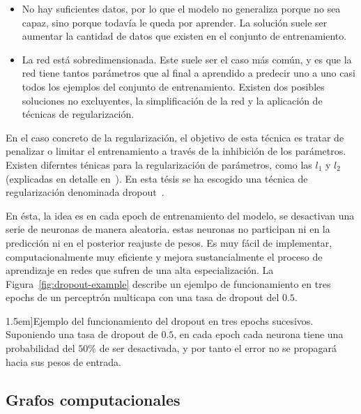 \begin{itemize}
	\item No hay suficientes datos, por lo que el modelo no generaliza porque no sea capaz, sino porque todavía le queda por aprender. La solución suele ser aumentar la cantidad de datos que existen en el conjunto de entrenamiento.
	\item La red está sobredimensionada. Este suele ser el caso más común, y es que la red tiene tantos parámetros que al final a aprendido a predecir uno a uno casi todos los ejemplos del conjunto de entrenamiento. Existen dos posibles soluciones no excluyentes, la simplificación de la red y la aplicación de técnicas de regularización.
\end{itemize}

En el caso concreto de la regularización, el objetivo de esta técnica es tratar de penalizar o limitar el entrenamiento a través de la inhibición de los parámetros. Existen diferntes ténicas para la regularización de parámetros, como las $l_1$ y $l_2$ (explicadas en detalle en~\cite{ng2004feature}). En esta tésis se ha escogido una técnica de regularización denominada dropout~\cite{srivastava2014dropout}.

En ésta, la idea es en cada epoch de entrenamiento del modelo, se desactivan una serie de neuronas de manera aleatoria. estas neuronas no participan ni en la predicción ni en el posterior reajuste de pesos. Es muy fácil de implementar, computacionalmente muy eficiente y mejora sustancialmente el proceso de aprendizaje en redes que sufren de una alta especialización. La Figura~\ref{fig:dropout-example} describe un ejemlpo de funcionamiento en tres epochs de un perceptrón multicapa con una tasa de dropout del $0.5$.

\begin{figure*}[t]
	\centering
	\qquad
	\qquad
	\caption[Ejemplo de la operación de dropout para tres epochs sucesivos][1.5em]{Ejemplo del funcionamiento del dropout en tres epochs sucesivos. Suponiendo una tasa de dropout de $0.5$, en cada epoch cada neurona tiene una probabilidad del $50\%$ de ser desactivada, y por tanto el error no se propagará hacia sus pesos de entrada.}
	\label{fig:dropout-example}
\end{figure*}

\subsection{Grafos computacionales}

